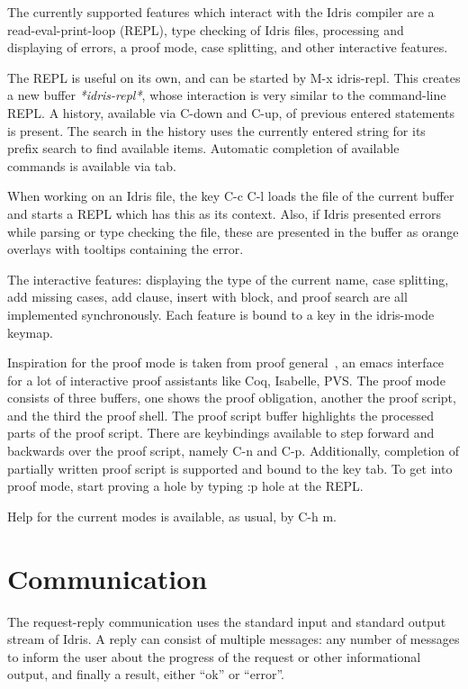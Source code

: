 \documentclass{article}
\begin{document}
The currently supported features which interact with the Idris compiler are a read-eval-print-loop (REPL), type checking of Idris files, processing and displaying of errors, a proof mode, case splitting, and other interactive features.

The REPL is useful on its own, and can be started by \textsf{M-x idris-repl}.
This creates a new buffer \emph{*idris-repl*}, whose interaction is very similar to the command-line REPL.
A history, available via C-down and C-up, of previous entered statements is present.
The search in the history uses the currently entered string for its prefix search to find available items.
Automatic completion of available commands is available via tab.

When working on an Idris file, the key C-c C-l loads the file of the current buffer and starts a REPL which has this as its context.
Also, if Idris presented errors while parsing or type checking the file, these are presented in the buffer as orange overlays with tooltips containing the error.

The interactive features: displaying the type of the current name, case splitting, add missing cases, add clause, insert with block, and proof search are all implemented synchronously.
Each feature is bound to a key in the idris-mode keymap.

Inspiration for the proof mode is taken from proof general~\cite{proofgeneral}, an emacs interface for a lot of interactive proof assistants like Coq, Isabelle, PVS.
The proof mode consists of three buffers, one shows the proof obligation, another the proof script, and the third the proof shell.
The proof script buffer highlights the processed parts of the proof script.
There are keybindings available to step forward and backwards over the proof script, namely C-n and C-p.
Additionally, completion of partially written proof script is supported and bound to the key tab.
To get into proof mode, start proving a hole by typing \textsf{:p hole} at the REPL.

Help for the current modes is available, as usual, by C-h m.

\section{Communication}\label{sec:protocol}
The request-reply communication uses the standard input and standard output stream of Idris.
A reply can consist of multiple messages: any number of messages to inform the user about the progress of the request or other informational output, and finally a result, either ``ok'' or ``error''.
\end{document}
